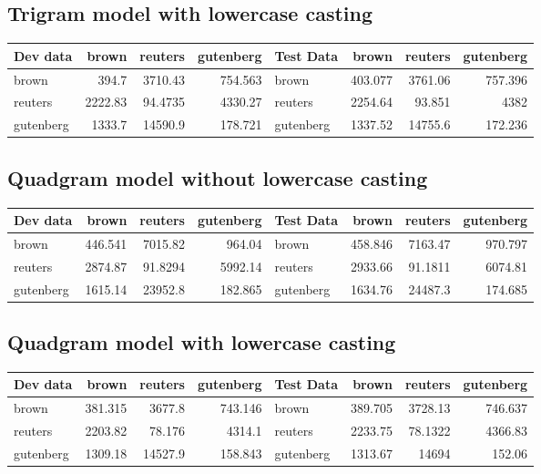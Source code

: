 \documentclass{article}
\begin{document}
\subsection{Trigram model with lowercase casting}

\begin{tabular}{lrrr|lrrr}
\hline
Dev data   &    brown &   reuters &   gutenberg & Test Data &     brown &   reuters &   gutenberg \\
\hline
 brown     &  394.7  &  3710.43   &     754.563 & brown     &  403.077 &  3761.06  &     757.396 \\
 reuters   & 2222.83 &    94.4735 &    4330.27  & reuters   & 2254.64  &    93.851 &    4382     \\
 gutenberg & 1333.7  & 14590.9    &     178.721 & gutenberg & 1337.52  & 14755.6   &     172.236 \\
\hline
\end{tabular}

\subsection{Quadgram model without lowercase casting}

\begin{tabular}{lrrr|lrrr}
\hline
Dev data   &    brown &   reuters &   gutenberg & Test Data &     brown &   reuters &   gutenberg \\
\hline
 brown     &  446.541 &  7015.82   &     964.04 & brown     &  458.846 &  7163.47   &     970.797 \\
 reuters   & 2874.87  &    91.8294 &    5992.14 & reuters   & 2933.66  &    91.1811 &    6074.81  \\
 gutenberg & 1615.14  & 23952.8    &     182.865& gutenberg & 1634.76  & 24487.3    &     174.685 \\
\hline
\end{tabular}

\subsection{Quadgram model with lowercase casting}

\begin{tabular}{lrrr|lrrr}
\hline
Dev data   &    brown &   reuters &   gutenberg & Test Data &     brown &   reuters &   gutenberg \\
\hline
 brown     &  381.315 &  3677.8   &     743.146 & brown     &  389.705 &  3728.13   &     746.637 \\
 reuters   & 2203.82  &    78.176 &    4314.1   & reuters   & 2233.75  &    78.1322 &    4366.83  \\
 gutenberg & 1309.18  & 14527.9   &     158.843 & gutenberg & 1313.67  & 14694      &     152.06  \\
\hline
\end{tabular}
\end{document}
